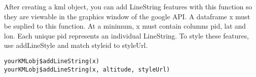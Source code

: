 \documentclass[a4paper]{book}
\begin{document}
%
\begin{Description}\relax
After creating a kml object, you can add LineString features with this function so they are viewable in the graphics window of the google API. A dataframe x must be suplied to this function. At a minimum, x must contain columns pid, lat and lon. Each unique pid represents an individual LineString. To style these features, use addLineStyle and match styleid to styleUrl. 
\end{Description}
%
\begin{Usage}
\begin{verbatim}
yourKMLobj$addLineString(x) 
yourKMLobj$addLineString(x, altitude, styleUrl)
\end{verbatim}
\end{Usage}
%
\end{document}
